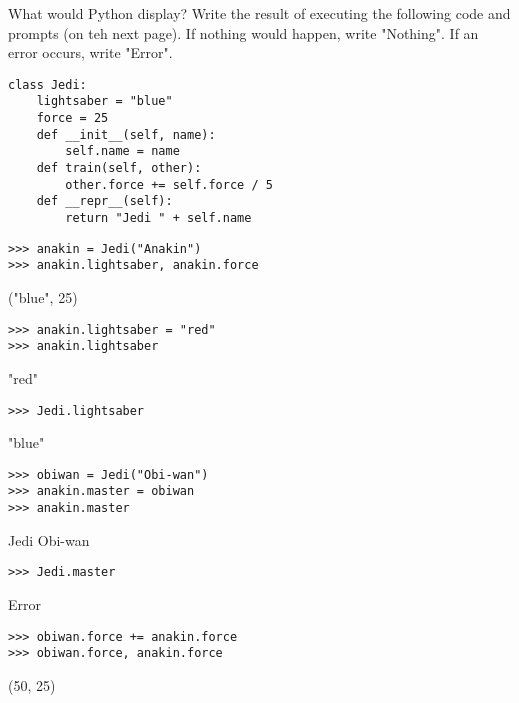 \begin{blocksection}
\question What would Python display? Write the result of executing the following code and prompts (on teh next page). If nothing would happen, write "Nothing". If an error occurs, write "Error".

\vspace{2\baselineskip}

\begin{lstlisting}
class Jedi:
    lightsaber = "blue"
    force = 25
    def __init__(self, name):
        self.name = name
    def train(self, other):
        other.force += self.force / 5
    def __repr__(self):
        return "Jedi " + self.name
\end{lstlisting}
\end{blocksection}

\newpage
\begin{blocksection}
\begin{lstlisting}
>>> anakin = Jedi("Anakin")
>>> anakin.lightsaber, anakin.force
\end{lstlisting}
\begin{solution}[.2in]
("blue", 25)
\end{solution}

\begin{lstlisting}
>>> anakin.lightsaber = "red"
>>> anakin.lightsaber 
\end{lstlisting}
\begin{solution}[.2in]
"red"
\end{solution}

\begin{lstlisting}
>>> Jedi.lightsaber 
\end{lstlisting}
\begin{solution}[.2in]
"blue"
\end{solution}

\begin{lstlisting}
>>> obiwan = Jedi("Obi-wan")
>>> anakin.master = obiwan
>>> anakin.master
\end{lstlisting}
\begin{solution}[.2in]
Jedi Obi-wan
\end{solution}

\begin{lstlisting}
>>> Jedi.master
\end{lstlisting}
\begin{solution}[.2in]
Error
\end{solution}

\begin{lstlisting}
>>> obiwan.force += anakin.force
>>> obiwan.force, anakin.force
\end{lstlisting}
\begin{solution}[.2in]
(50, 25)
\end{solution}


\end{blocksection}
